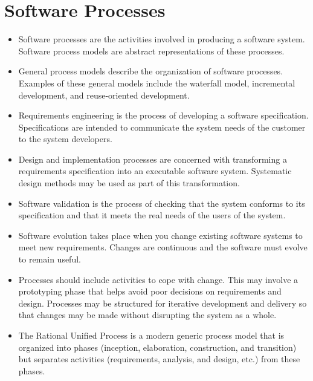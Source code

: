 \documentclass{article}
\begin{document}
\section{Software Processes}
\begin{itemize}
    \item Software processes are the activities involved in producing a software system.  Software process models are abstract representations of these processes.
    \item General process models describe the organization of software processes.  Examples of these general models include the waterfall model, incremental development, and reuse-oriented development.
    \item Requirements engineering is the process of developing a software specification.  Specifications are intended to communicate the system needs of the customer to the system developers.
    \item Design and implementation processes are concerned with transforming a requirements specification into an executable software system.  Systematic design methods may be used as part of this transformation.
    \item Software validation is the process of checking that the system conforms to its specification and that it meets the real needs of the users of the system.
    \item Software evolution takes place when you change existing software systems to meet new requirements.  Changes are continuous and the software must evolve to remain useful.
    \item Processes should include activities to cope with change.  This may involve a prototyping phase that helps avoid poor decisions on requirements and design.
        Processes may be structured for iterative development and delivery so that changes may be made without disrupting the system as a whole.
    \item The Rational Unified Process is a modern generic process model that is organized into phases (inception, elaboration, construction, and transition) but separates activities (requirements, analysis, and design, etc.) from these phases.
\end{itemize}
\end{document}
